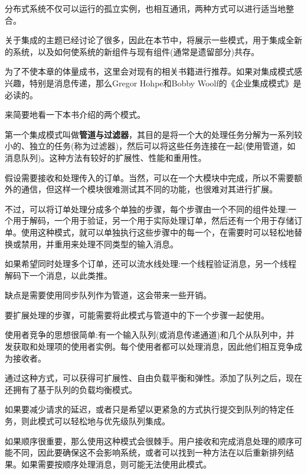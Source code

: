 

分布式系统不仅可以运行的孤立实例，也相互通讯，两种方式可以进行适当地整合。

关于集成的主题已经讨论了很多，因此在本节中，将展示一些模式，用于集成全新的系统，以及如何使系统的新组件与现有组件(通常是遗留部分)共存。

为了不使本章的体量成书，这里会对现有的相关书籍进行推荐。如果对集成模式感兴趣，特别是消息传递，那么Gregor Hohpe和Bobby Woolf的《企业集成模式》是必读的。

来简要地看一下本书介绍的两个模式。


第一个集成模式叫做\textbf{管道与过滤器}，其目的是将一个大的处理任务分解为一系列较小的、独立的任务(称为过滤器)，然后可以将这些任务连接在一起(使用管道，如消息队列)。这种方法有较好的扩展性、性能和重用性。

假设需要接收和处理传入的订单。当然，可以在一个大模块中完成，所以不需要额外的通信，但这样一个模块很难测试其不同的功能，也很难对其进行扩展。

不过，可以将订单处理分成多个单独的步骤，每个步骤由一个不同的组件处理:一个用于解码，一个用于验证，另一个用于实际处理订单，然后还有一个用于存储订单。使用这种模式，就可以单独执行这些步骤中的每一个，在需要时可以轻松地替换或禁用，并重用来处理不同类型的输入消息。

如果希望同时处理多个订单，还可以流水线处理:一个线程验证消息，另一个线程解码下一个消息，以此类推。

缺点是需要使用同步队列作为管道，这会带来一些开销。

要扩展处理的步骤，可能需要将此模式与管道中的下一个步骤一起使用。


使用者竞争的思想很简单:有一个输入队列(或消息传递通道)和几个从队列中，并发获取和处理项的使用者实例。每个使用者都可以处理消息，因此他们相互竞争成为接收者。

通过这种方式，可以获得可扩展性、自由负载平衡和弹性。添加了队列之后，现在还拥有了基于队列的负载均衡模式。

如果要减少请求的延迟，或者只是希望以更紧急的方式执行提交到队列的特定任务，则此模式可以轻松地与优先级队列集成。

\begin{tcolorbox}[colback=blue!5!white,colframe=blue!75!black, title=Note]
\hspace*{0.75cm}如果顺序很重要，那么使用这种模式会很棘手。用户接收和完成消息处理的顺序可能不同，因此要确保这不会影响系统，或者可以找到一种方法在以后重新排列结果。如果需要按顺序处理消息，则可能无法使用此模式。
\end{tcolorbox}


